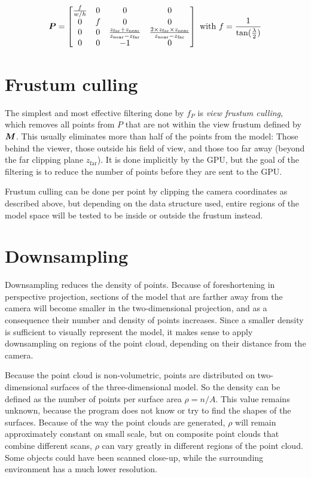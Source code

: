 \documentclass[a4paper,10pt,abstracton,notitlepage]{scrreprt}
\begin{document}
\begin{displaymath}
\matrixsym{P} = \begin{bmatrix}
\frac{f}{w/h} & 0 & 0 & 0 \\
0 & f & 0 & 0 \\
0 & 0 & \frac{z_{\mathrm{far}} + z_{\mathrm{near}}}{z_{\mathrm{near}} - z_{\mathrm{far}}} & \frac{2 \times z_{\mathrm{far}} \times z_{\mathrm{near}}}{z_{\mathrm{near}} - z_{\mathrm{far}}} \\
0 & 0 & -1 & 0
\end{bmatrix}
\text{ with }
f = \frac{1}{\tan(\frac{\lambda}{2})}
\end{displaymath}


\section{Frustum culling}
The simplest and most effective filtering done by $f_{P}$ is \emph{view frustum culling}, which removes all points from $P$ that are not within the view frustum defined by $\matrixsym{M}$. This usually eliminates more than half of the points from the model: Those behind the viewer, those outside his field of view, and those too far away (beyond the far clipping plane $z_{\mathrm{far}}$). It is done implicitly by the GPU, but the goal of the filtering is to reduce the number of points before they are sent to the GPU.

Frustum culling can be done per point by clipping the camera coordinates as described above, but depending on the data structure used, entire regions of the model space will be tested to be inside or outside the frustum instead.


\section{Downsampling} \label{sec:downsampling}
Downsampling reduces the density of points. Because of foreshortening in perspective projection, sections of the model that are farther away from the camera will become smaller in the two-dimensional projection, and as a consequence their number and density of points increases. Since a smaller density is sufficient to visually represent the model, it makes sense to apply downsampling on regions of the point cloud, depending on their distance from the camera.

Because the point cloud is non-volumetric, points are distributed on two-dimensional surfaces of the three-dimensional model. So the density can be defined as the number of points per surface area $\rho = n/A$. This value remains unknown, because the program does not know or try to find the shapes of the surfaces. Because of the way the point clouds are generated, $\rho$ will remain approximately constant on small scale, but on composite point clouds that combine different scans, $\rho$ can vary greatly in different regions of the point cloud. Some objects could have been scanned close-up, while the surrounding environment has a much lower resolution. 
\end{document}
